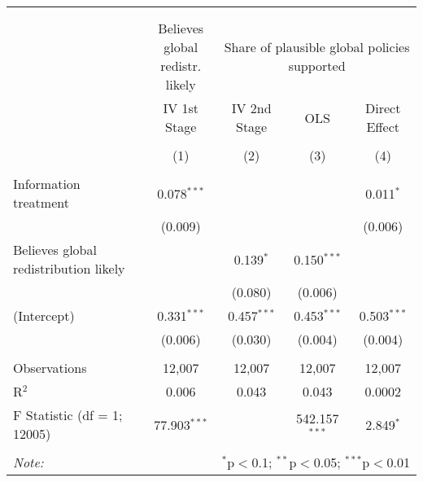 
\begin{tabular}{@{\extracolsep{5pt}}lcccc} 
\\[-1.8ex]\hline 
\hline \\[-1.8ex] 
\\[-1.8ex] & \makecell{Believes global\\redistr. likely} & \multicolumn{3}{c}{Share of plausible global policies supported} \\ 
 & IV 1st Stage & IV 2nd Stage & OLS & Direct Effect \\ 
\\[-1.8ex] & (1) & (2) & (3) & (4)\\ 
\hline \\[-1.8ex] 
 Information treatment & 0.078$^{***}$ &  &  & 0.011$^{*}$ \\ 
  & (0.009) &  &  & (0.006) \\ 
  Believes global redistribution likely &  & 0.139$^{*}$ & 0.150$^{***}$ &  \\ 
  &  & (0.080) & (0.006) &  \\ 
  (Intercept) & 0.331$^{***}$ & 0.457$^{***}$ & 0.453$^{***}$ & 0.503$^{***}$ \\ 
  & (0.006) & (0.030) & (0.004) & (0.004) \\ 
 \hline \\[-1.8ex] 
Observations & 12,007 & 12,007 & 12,007 & 12,007 \\ 
R$^{2}$ & 0.006 & 0.043 & 0.043 & 0.0002 \\ 
F Statistic (df = 1; 12005) & 77.903$^{***}$ &  & 542.157$^{***}$ & 2.849$^{*}$ \\ 
\hline 
\hline \\[-1.8ex] 
\textit{Note:}  & \multicolumn{4}{r}{$^{*}$p$<$0.1; $^{**}$p$<$0.05; $^{***}$p$<$0.01} \\ 
\end{tabular} 
